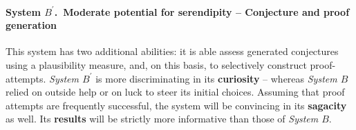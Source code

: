 \paragraph{System $B^{\prime}$.~Moderate potential for serendipity -- Conjecture and proof generation}

This system has two additional abilities: it is able assess generated
conjectures using a plausibility measure, and, on this basis, to selectively construct proof-attempts.  %
\emph{System $B^{\prime}$} is more discriminating in its
\textbf{curiosity} -- whereas \emph{System $B$} relied
on outside help or on luck to steer its initial choices.  Assuming that proof attempts are frequently successful, the system will be convincing in its \textbf{sagacity} as well.  Its \textbf{results} will be strictly more informative than those of \emph{System $B$}.

